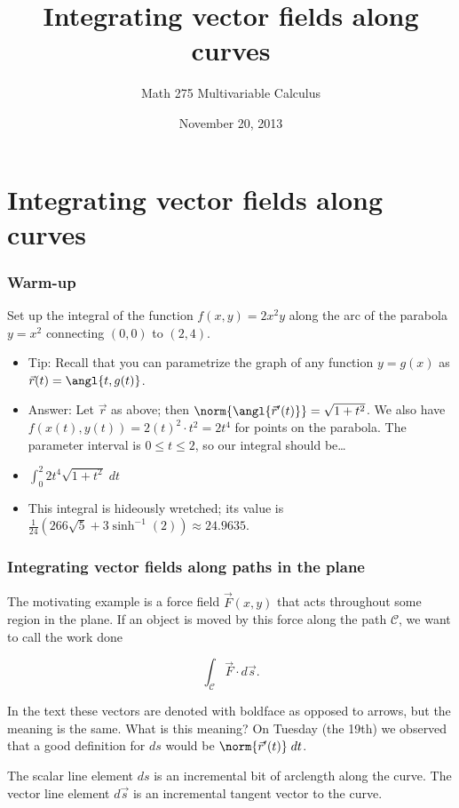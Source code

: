 \documentclass[11pt,ignorenonframetext,aspectratio=169,xcolor={svgnames}]{beamer}
\title{Integrating vector fields along curves}
\author{Math 275 Multivariable Calculus}
\date{November 20, 2013}
\begin{document}
\frame{\titlepage}

\section{Integrating vector fields along curves}

\begin{frame}\frametitle{Warm-up}

Set up the integral of the function $f(x,y) = 2x^2 y$ along the arc of
the parabola $y = x^2$ connecting $(0,0)$ to $(2,4)$.

\begin{itemize}[<+->]
\itemsep1pt\parskip0pt
\item
  Tip: Recall that you can parametrize the graph of any function
  $y = g(x)$ as $\vec{r}(t) = \angl{t, g(t)}$.
\item
  Answer: Let $\vec{r}$ as above; then
  $\norm{\angl{\vec{r}'(t)}} = \sqrt{1+t^2}$. We also have
  $f(x(t),y(t)) = 2(t)^2 \cdot t^2 = 2t^4$ for points on the parabola.
  The parameter interval is $0 \leq t \leq 2$, so our integral should
  be\ldots{}
\item
  $\int_0^2 2t^4 \sqrt{1+t^2} \; dt$
\item
  This integral is hideously wretched; its value is
  $\frac{1}{24} \left( 266 \sqrt{5} + 3 \sinh^{-1}(2) \right) \approx 24.9635$.
\end{itemize}

\end{frame}

\begin{frame}\frametitle{Integrating vector fields along paths in the
plane}

The motivating example is a force field $\vec{F}(x,y)$ that acts
throughout some region in the plane. If an object is moved by this force
along the path $\mathcal{C}$, we want to call the work done

\begin{equation*}
    \int_{\mathcal{C}} \vec{F} \cdot d\vec{s}.
\end{equation*}

In the text these vectors are denoted with boldface as opposed to
arrows, but the meaning is the same. What is this meaning? On Tuesday
(the 19th) we observed that a good definition for $ds$ would be
$\norm{\vec{r}'(t)} \; dt$.

The scalar line element $ds$ is an incremental bit of arclength along
the curve. The vector line element $d\vec{s}$ is an incremental tangent
vector to the curve.

\end{frame}
\end{document}
